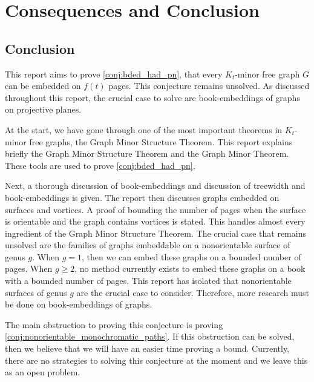 \chapter{Consequences and Conclusion}\label{chap:conclusion}



\section{Conclusion}
This report aims to prove \cref{conj:bded_had_pn}, that every $K_t$-minor free graph $G$ can be embedded on $f(t)$ pages. This conjecture remains unsolved. 
As discussed throughout this report, the crucial case to solve are book-embeddings of graphs on projective planes. 

At the start, we have gone through one of the most important theorems in $K_t$-minor free graphs, the Graph Minor Structure Theorem. This report explains briefly the Graph Minor Structure Theorem and the Graph Minor Theorem. 
These tools are used to prove \cref{conj:bded_had_pn},

Next, a thorough discussion of book-embeddings and discussion of treewidth and book-embeddings is given. The report then discusses graphs embedded on surfaces and vortices. A proof of bounding the number of pages when the surface is orientable and the graph contains vortices is stated. This handles almost every ingredient of the Graph Minor Structure Theorem. The crucial case that remains unsolved are the families of graphs embeddable on a nonorientable surface of genus $g$. When $g = 1$, then we can embed these graphs on a bounded number of pages. When $g \geq 2$, no method currently exists to embed these graphs on a book with a bounded number of pages. This report has isolated that nonorientable surfaces of genus $g$ are the crucial case to consider. Therefore, more research must be done on book-embeddings of graphs. 

The main obstruction to proving this conjecture is proving \cref{conj:nonorientable_monochromatic_paths}. If this obstruction can be solved, then we believe that we will have an easier time proving a bound. Currently, there are no strategies to solving this conjecture at the moment and we leave this as an open problem. 

